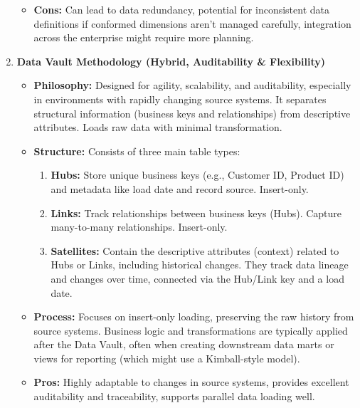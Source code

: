 \begin{enumerate}
\begin{itemize}
        \item \textbf{Cons:} Can lead to data redundancy, potential for
        inconsistent data definitions if conformed dimensions aren't managed
        carefully, integration across the enterprise might require more
        planning.
    \end{itemize}




    \item \textbf{Data Vault Methodology (Hybrid, Auditability & Flexibility)}

    \begin{itemize}
        \item \textbf{Philosophy:} Designed for agility, scalability, and
        auditability, especially in environments with rapidly changing
        source systems. It separates structural information (business
        keys and relationships) from descriptive attributes. Loads raw
        data with minimal transformation.

        \item \textbf{Structure:} Consists of three main table types:
        \begin{enumerate}
            \item \textbf{Hubs:} Store unique business keys
            (e.g., Customer ID, Product ID) and metadata like load
            date and record source. Insert-only.

            \item \textbf{Links:} Track relationships between business keys
            (Hubs). Capture many-to-many relationships. Insert-only.

            \item \textbf{Satellites:} Contain the descriptive attributes
            (context) related to Hubs or Links, including historical changes.
            They track data lineage and changes over time, connected via the
            Hub/Link key and a load date.
        \end{enumerate}

        \item \textbf{Process:} Focuses on insert-only loading, preserving
        the raw history from source systems. Business logic and transformations
        are typically applied after the Data Vault, often when creating
        downstream data marts or views for reporting
        (which might use a Kimball-style model).

        \item \textbf{Pros:} Highly adaptable to changes in source systems,
        provides excellent auditability and traceability, supports parallel
        data loading well.


\end{itemize}
\end{enumerate}
